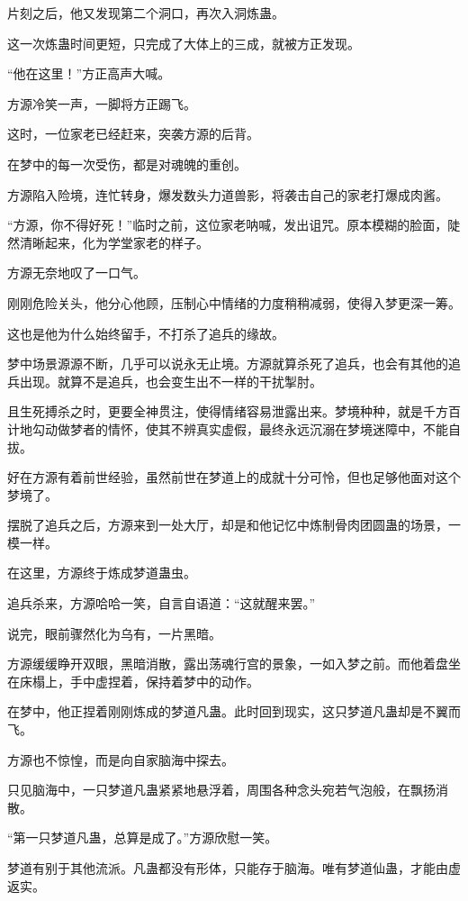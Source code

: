 \begin{this_body}
片刻之后，他又发现第二个洞口，再次入洞炼蛊。

这一次炼蛊时间更短，只完成了大体上的三成，就被方正发现。

“他在这里！”方正高声大喊。

方源冷笑一声，一脚将方正踢飞。

这时，一位家老已经赶来，突袭方源的后背。

在梦中的每一次受伤，都是对魂魄的重创。

方源陷入险境，连忙转身，爆发数头力道兽影，将袭击自己的家老打爆成肉酱。

“方源，你不得好死！”临时之前，这位家老呐喊，发出诅咒。原本模糊的脸面，陡然清晰起来，化为学堂家老的样子。

方源无奈地叹了一口气。

刚刚危险关头，他分心他顾，压制心中情绪的力度稍稍减弱，使得入梦更深一筹。

这也是他为什么始终留手，不打杀了追兵的缘故。

梦中场景源源不断，几乎可以说永无止境。方源就算杀死了追兵，也会有其他的追兵出现。就算不是追兵，也会变生出不一样的干扰掣肘。

且生死搏杀之时，更要全神贯注，使得情绪容易泄露出来。梦境种种，就是千方百计地勾动做梦者的情怀，使其不辨真实虚假，最终永远沉溺在梦境迷障中，不能自拔。

好在方源有着前世经验，虽然前世在梦道上的成就十分可怜，但也足够他面对这个梦境了。

摆脱了追兵之后，方源来到一处大厅，却是和他记忆中炼制骨肉团圆蛊的场景，一模一样。

在这里，方源终于炼成梦道蛊虫。

追兵杀来，方源哈哈一笑，自言自语道：“这就醒来罢。”

说完，眼前骤然化为乌有，一片黑暗。

方源缓缓睁开双眼，黑暗消散，露出荡魂行宫的景象，一如入梦之前。而他着盘坐在床榻上，手中虚捏着，保持着梦中的动作。

在梦中，他正捏着刚刚炼成的梦道凡蛊。此时回到现实，这只梦道凡蛊却是不翼而飞。

方源也不惊惶，而是向自家脑海中探去。

只见脑海中，一只梦道凡蛊紧紧地悬浮着，周围各种念头宛若气泡般，在飘扬消散。

“第一只梦道凡蛊，总算是成了。”方源欣慰一笑。

梦道有别于其他流派。凡蛊都没有形体，只能存于脑海。唯有梦道仙蛊，才能由虚返实。

\end{this_body}

